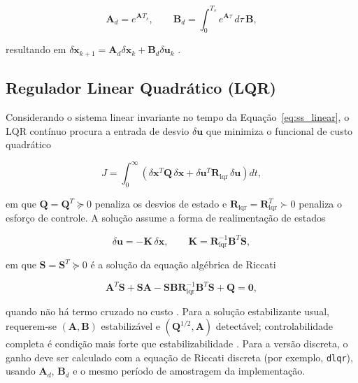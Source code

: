 \begin{equation}\label{eq:discretizacao}
\mathbf{A}_d=e^{\mathbf{A}T_s},\qquad
\mathbf{B}_d=\int_0^{T_s}e^{\mathbf{A}\tau}\,d\tau\,\mathbf{B},
\end{equation}

\noindent resultando em $\delta\mathbf{x}_{k+1}=\mathbf{A}_d\delta\mathbf{x}_k+\mathbf{B}_d\delta\mathbf{u}_k$ \cite{franklin1998}.

\subsection{Regulador Linear Quadrático (LQR)}\label{subsec:lqr}

Considerando o sistema linear invariante no tempo da Equação~\eqref{eq:ss_linear}, o LQR contínuo procura a entrada de desvio $\delta\mathbf{u}$ que minimiza o funcional de custo quadrático

\begin{equation}\label{eq:custo_lqr}
J = \int_0^{\infty}\left(\delta\mathbf{x}^{T}\mathbf{Q}\,\delta\mathbf{x}+\delta\mathbf{u}^{T}\mathbf{R}_{\mathrm{lqr}}\,\delta\mathbf{u}\right)dt,
\end{equation}

\noindent em que $\mathbf{Q}=\mathbf{Q}^T\succeq0$ penaliza os desvios de estado e $\mathbf{R}_{\mathrm{lqr}}=\mathbf{R}_{\mathrm{lqr}}^T\succ0$ penaliza o esforço de controle. A solução assume a forma de realimentação de estados

\begin{equation}\label{eq:lei_lqr}
\delta\mathbf{u}=-\mathbf{K}\,\delta\mathbf{x},\qquad \mathbf{K}=\mathbf{R}_{\mathrm{lqr}}^{-1}\mathbf{B}^{T}\mathbf{S},
\end{equation}

\noindent em que $\mathbf{S}=\mathbf{S}^T\succeq 0$ é a solução da equação algébrica de Riccati

\begin{equation}\label{eq:riccati_lqr}
\mathbf{A}^{T}\mathbf{S}+\mathbf{S}\mathbf{A}-\mathbf{S}\mathbf{B}\mathbf{R}_{\mathrm{lqr}}^{-1}\mathbf{B}^{T}\mathbf{S}+\mathbf{Q}=\mathbf{0},
\end{equation}

\noindent quando não há termo cruzado no custo \cite{ogata2010,anderson1990,mathworkslqr}. Para a solução estabilizante usual, requerem-se $(\mathbf{A},\mathbf{B})$ estabilizável e $(\mathbf{Q}^{1/2},\mathbf{A})$ detectável; controlabilidade completa é condição mais forte que estabilizabilidade \cite{anderson1990}. Para a versão discreta, o ganho deve ser calculado com a equação de Riccati discreta (por exemplo, \texttt{dlqr}), usando $\mathbf{A}_d$, $\mathbf{B}_d$ e o mesmo período de amostragem da implementação.

